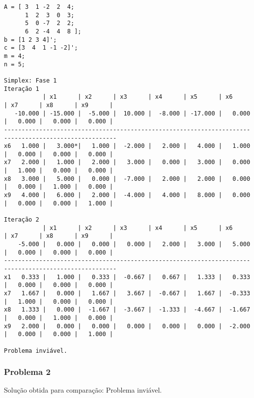 \documentclass[brazil,times]{abnt}
\begin{document}
{\scriptsize \begin{verbatim}
A = [ 3  1 -2  2  4;
      1  2  3  0  3;
      5  0 -7  2  2;
      6  2 -4  4  8 ];
b = [1 2 3 4]';
c = [3  4  1 -1 -2]';
m = 4;
n = 5;

Simplex: Fase 1
Iteração 1
           | x1      | x2      | x3      | x4      | x5      | x6      | x7      | x8      | x9      |
   -10.000 | -15.000 |  -5.000 |  10.000 |  -8.000 | -17.000 |   0.000 |   0.000 |   0.000 |   0.000 |
------------------------------------------------------------------------------------------------------
x6   1.000 |   3.000*|   1.000 |  -2.000 |   2.000 |   4.000 |   1.000 |   0.000 |   0.000 |   0.000 |
x7   2.000 |   1.000 |   2.000 |   3.000 |   0.000 |   3.000 |   0.000 |   1.000 |   0.000 |   0.000 |
x8   3.000 |   5.000 |   0.000 |  -7.000 |   2.000 |   2.000 |   0.000 |   0.000 |   1.000 |   0.000 |
x9   4.000 |   6.000 |   2.000 |  -4.000 |   4.000 |   8.000 |   0.000 |   0.000 |   0.000 |   1.000 |

Iteração 2
           | x1      | x2      | x3      | x4      | x5      | x6      | x7      | x8      | x9      |
    -5.000 |   0.000 |   0.000 |   0.000 |   2.000 |   3.000 |   5.000 |   0.000 |   0.000 |   0.000 |
------------------------------------------------------------------------------------------------------
x1   0.333 |   1.000 |   0.333 |  -0.667 |   0.667 |   1.333 |   0.333 |   0.000 |   0.000 |   0.000 |
x7   1.667 |   0.000 |   1.667 |   3.667 |  -0.667 |   1.667 |  -0.333 |   1.000 |   0.000 |   0.000 |
x8   1.333 |   0.000 |  -1.667 |  -3.667 |  -1.333 |  -4.667 |  -1.667 |   0.000 |   1.000 |   0.000 |
x9   2.000 |   0.000 |   0.000 |   0.000 |   0.000 |   0.000 |  -2.000 |   0.000 |   0.000 |   1.000 |

Problema inviável.
\end{verbatim} }

\subsubsection*{Problema 2}
Solução obtida para comparação: Problema inviável.
\end{document}
